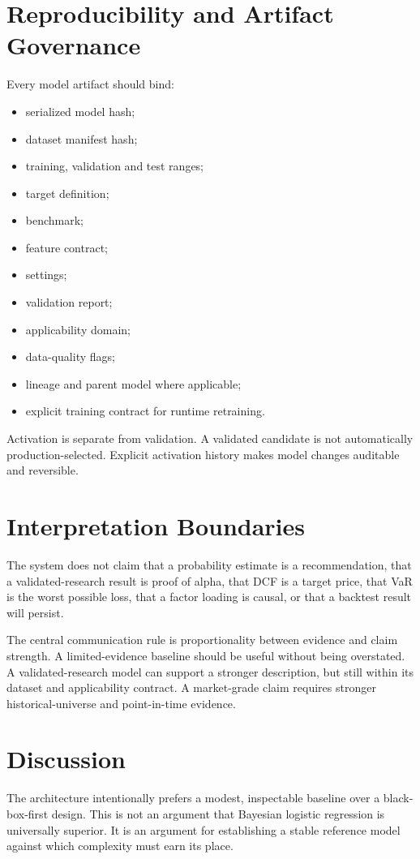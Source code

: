 \documentclass[11pt]{article}
\begin{document}
\section{Reproducibility and Artifact Governance}
Every model artifact should bind:
\begin{itemize}[itemsep=0.15em]
\item serialized model hash;
\item dataset manifest hash;
\item training, validation and test ranges;
\item target definition;
\item benchmark;
\item feature contract;
\item settings;
\item validation report;
\item applicability domain;
\item data-quality flags;
\item lineage and parent model where applicable;
\item explicit training contract for runtime retraining.
\end{itemize}

Activation is separate from validation. A validated candidate is not automatically production-selected. Explicit activation history makes model changes auditable and reversible.

\section{Interpretation Boundaries}
The system does not claim that a probability estimate is a recommendation, that a validated-research result is proof of alpha, that DCF is a target price, that VaR is the worst possible loss, that a factor loading is causal, or that a backtest result will persist.

The central communication rule is proportionality between evidence and claim strength. A limited-evidence baseline should be useful without being overstated. A validated-research model can support a stronger description, but still within its dataset and applicability contract. A market-grade claim requires stronger historical-universe and point-in-time evidence.

\section{Discussion}
The architecture intentionally prefers a modest, inspectable baseline over a black-box-first design. This is not an argument that Bayesian logistic regression is universally superior. It is an argument for establishing a stable reference model against which complexity must earn its place.
\end{document}
